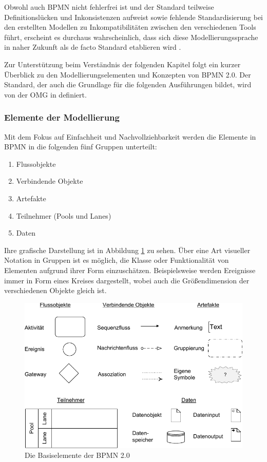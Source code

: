 \documentclass[a4paper,12pt]{report}
\begin{document}
Obwohl auch BPMN nicht fehlerfrei ist und der Standard teilweise Definitionslücken und Inkonsistenzen aufweist sowie fehlende Standardisierung bei den erstellten Modellen zu Inkompatibilitäten zwischen den verschiedenen Tools führt, erscheint es durchaus wahrscheinlich, dass sich diese Modellierungssprache in naher Zukunft als de facto Standard etablieren wird \cite[vgl.][S.161]{Kossak2014}.

Zur Unterstützung beim Verständnis der folgenden Kapitel folgt ein kurzer Überblick zu den Modellierungselementen und Konzepten von \ac{BPMN} 2.0. Der Standard, der auch die Grundlage für die folgenden Ausführungen bildet, wird von der \ac{OMG} in \citep{OMG2011} definiert.

\subsubsection{Elemente der Modellierung}\label{subsubsec:BPMNElemente}

Mit dem Fokus auf Einfachheit und Nachvollziehbarkeit werden die Elemente in \ac{BPMN} in die folgenden fünf Gruppen unterteilt:
\begin{enumerate}
\item Flussobjekte
\item Verbindende Objekte
\item Artefakte
\item Teilnehmer (Pools und Lanes)
\item Daten
\end{enumerate}
Ihre grafische Darstellung ist in Abbildung \ref{bpmn_basic_elements} zu sehen. Über eine Art visueller Notation in Gruppen ist es möglich, die Klasse oder Funktionalität von Elementen aufgrund ihrer Form einzuschätzen. Beispielsweise werden Ereignisse immer in Form eines Kreises dargestellt, wobei auch die Größendimension der verschiedenen Objekte gleich ist.
\begin{figure}[ht]
\centering
\includegraphics[width=1\textwidth]{Images/bpmn_basic_elements}
\caption[Die Basiselemente der BPMN 2.0]{Die Basiselemente der BPMN 2.0 \citep[S. 23]{Freund2014}}
\label{bpmn_basic_elements}
\end{figure}
\end{document}
